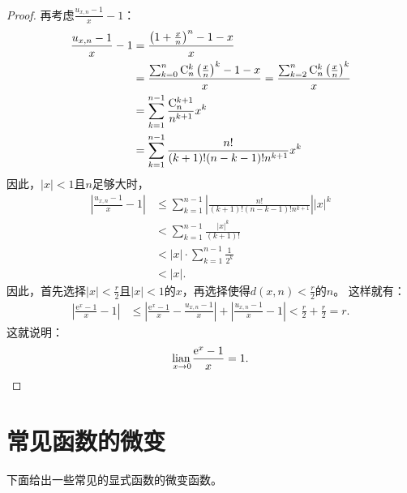 \documentclass[12pt,UTF8,fontset=none]{ctexbook}
\begin{document}
\begin{appendix}
\begin{proof}
    再考虑$\frac{u_{x,n} - 1}{x} - 1$：
    \begin{align*}
        \frac{u_{x,n} - 1}{x} - 1 &= \frac{\left(1 + \frac{x}{n}\right)^{n} - 1 - x}{x}  \\
        &= \frac{\sum_{k=0}^n \mathrm{C}_{n}^{k} \left(\frac{x}{n}\right)^k - 1 - x}{x} = \frac{\sum_{k=2}^n \mathrm{C}_{n}^{k} \left(\frac{x}{n}\right)^k}{x}  \\
        &= \sum_{k=1}^{n-1} \frac{\mathrm{C}_{n}^{k+1}}{n^{k+1}} x^k  \\
        &= \sum_{k=1}^{n-1} \frac{n!}{(k+1)!(n-k-1)!n^{k+1}} x^k  
    \end{align*}
    因此，$|x|<1$且$n$足够大时，
    \begin{align*}
        \left| \frac{u_{x,n} - 1}{x} - 1 \right| &\leqslant \sum_{k=1}^{n-1} \left|\frac{n!}{(k+1)!(n-k-1)!n^{k+1}}\right| |x|^k  \\
        &< \sum_{k=1}^{n-1} \frac{|x|^k}{(k+1)!}  \\
        &< |x| \cdot \sum_{k=1}^{n-1} \frac{1}{2^k}  \\
        &< |x|.  
    \end{align*}
    因此，首先选择$|x| < \frac{r}{2}$且$|x|<1$的$x$，再选择使得$d(x, n) < \frac{r}{2}$的$n$。
    这样就有：
    \begin{align*}
        \left|\frac{\mathrm{e}^x - 1}{x} - 1\right| &\leqslant \left|\frac{\mathrm{e}^x - 1}{x} - \frac{u_{x,n} - 1}{x}\right| + \left|\frac{u_{x,n} - 1}{x} - 1\right|  < \frac{r}{2} + \frac{r}{2} = r.   
    \end{align*}
    这就说明：
    $$\underset{x\to 0}{\operatorname{lian}\,} \frac{\mathrm{e}^x - 1}{x} = 1.$$
\end{proof}

\section{常见函数的微变}

下面给出一些常见的显式函数的微变函数。


\end{appendix}
\end{document}
